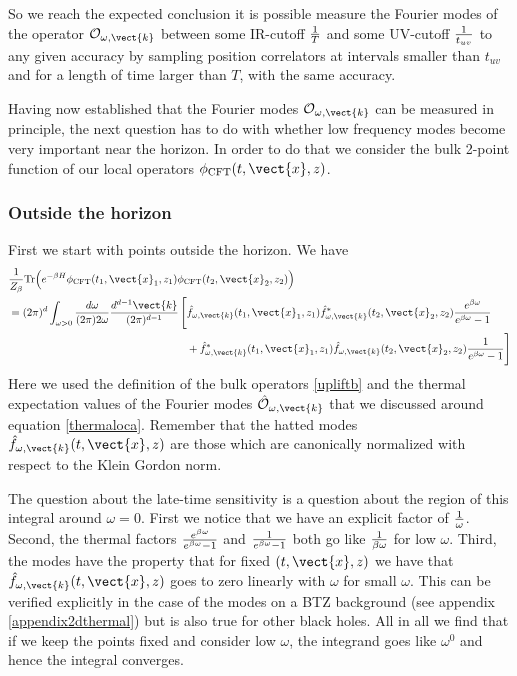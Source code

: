 So we reach the expected conclusion it is possible measure the Fourier modes
of the operator ${\cal O}_{\omega, \vect{k}}$ between some IR-cutoff ${1 \over T}$ and some UV-cutoff ${1 \over t_{uv}}$ to any given accuracy
by sampling position correlators at intervals smaller than $t_{uv}$ and for a length of time larger than $T$, with the same accuracy.














Having now established that the Fourier modes ${\cal O}_{\omega, \vect{k}}$ 
can be measured in principle, the next question has to do with whether
low frequency modes become very important near the horizon. In order to do that we consider the bulk 2-point function of our local operators $\phi_{\rm CFT}(t,\vect{x},z)$.

\subsubsection{Outside the horizon}
First we start with points outside the horizon. We have
\begin{align*}
&{1 \over Z_{\beta}} {\rm Tr}\Big(e^{-\beta H} \phi_{\rm CFT}(t_1,\vect{x}_1,z_1)  \phi_{\rm CFT}(t_2,\vect{x}_2,z_2)\Big)  \\
&= (2\pi)^d \int_{\omega>0} {d\omega \over (2 \pi) 2 \omega} {d^{d-1}\vect{k} \over (2 \pi)^{d-1}}\, \begin{aligned}[t] \Bigg[&\hat{f}_{\omega,\vect{k}}(t_1,\vect{x}_1,z_1) \hat{f}^*_{\omega,\vect{k}}(t_2,\vect{x}_2,z_2) {e^{\beta \omega}
\over e^{\beta \omega}-1} \\ & + 
 \hat{f}^*_{\omega,\vect{k}}(t_1,\vect{x}_1,z_1) \hat{f}_{\omega,\vect{k}}(t_2,\vect{x}_2,z_2) {1
\over e^{\beta \omega}-1} \Bigg]
\end{aligned}
\end{align*}
Here we used the definition of the bulk operators \eqref{upliftb} and the thermal expectation values of the Fourier modes $\hat{\cal O}_{\omega,\vect{k}}$ that we discussed around equation \eqref{thermaloca}. Remember that the hatted modes $\hat{f}_{\omega,\vect{k}}(t,\vect{x},z)$ are those which are canonically normalized with respect to the Klein Gordon norm.

The question about the late-time sensitivity is a question about the region of this integral around $\omega=0$. First we notice that we have an explicit factor of ${1\over \omega}$. Second, the thermal factors ${e^{\beta\omega}\over e^{\beta\omega}-1}$ and ${1\over e^{\beta\omega}-1}$ both go like ${1\over \beta \omega}$ for low $\omega$. Third, the modes have the property that for fixed $(t,\vect{x},z)$ we have that $\hat{f}_{\omega,\vect{k}}(t,\vect{x},z)$ goes to zero linearly with $\omega$ for small $\omega$. This can be verified explicitly in the case of the modes on a BTZ background (see appendix \ref{appendix2dthermal}) but is also true for other black holes. All in all we find that if we keep the points fixed and consider low $\omega$, the integrand goes like $\omega^0$ and hence the integral converges.

